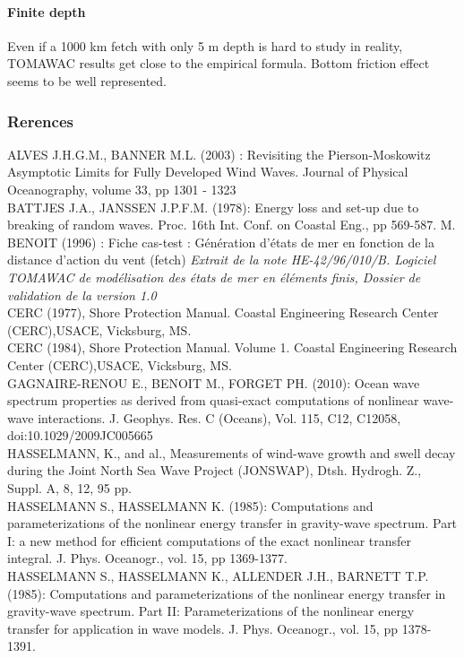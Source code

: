 \paragraph*{Finite depth}
Even if a 1000 km fetch with only 5 m depth is hard to study in reality, TOMAWAC results get close to the empirical formula. Bottom friction effect seems to be well represented.
\subsubsection*{Rerences}

ALVES J.H.G.M., BANNER M.L. (2003) : Revisiting the Pierson-Moskowitz Asymptotic Limits for Fully Developed Wind Waves. Journal of Physical Oceanography, volume 33, pp 1301 - 1323\\
 BATTJES J.A., JANSSEN J.P.F.M. (1978): Energy loss and set-up due to breaking of random waves. Proc.
16th Int. Conf. on Coastal Eng., pp 569-587.
 M. BENOIT (1996) : Fiche cas-test : G\'en\'eration d'\'etats de mer en fonction de la distance d'action du vent (fetch) \textit{Extrait de la note HE-42/96/010/B. Logiciel TOMAWAC de mod\'elisation des \'etats de mer en \'el\'ements finis, Dossier de validation de la version 1.0} \\
 CERC (1977), Shore Protection Manual. Coastal Engineering Research Center (CERC),USACE, Vicksburg, MS.\\
 CERC (1984), Shore Protection Manual. Volume 1. Coastal Engineering Research Center (CERC),USACE, Vicksburg, MS.\\
GAGNAIRE-RENOU E., BENOIT M., FORGET PH. (2010): Ocean wave spectrum properties as derived
from quasi-exact computations of nonlinear wave-wave interactions. J. Geophys. Res. C (Oceans),
Vol. 115, C12, C12058, doi:10.1029/2009JC005665\\
 HASSELMANN, K., and al., Measurements of wind-wave growth and swell decay during the Joint North Sea Wave Project (JONSWAP), Dtsh. Hydrogh. Z., Suppl. A, 8, 12, 95 pp.\\
HASSELMANN S., HASSELMANN K. (1985): Computations and parameterizations of the nonlinear energy
transfer in gravity-wave spectrum. Part I: a new method for efficient computations of the exact nonlinear
transfer integral. J. Phys. Oceanogr., vol. 15, pp 1369-1377.\\
HASSELMANN S., HASSELMANN K., ALLENDER J.H., BARNETT T.P. (1985): Computations and
parameterizations of the nonlinear energy transfer in gravity-wave spectrum. Part II: Parameterizations of
the nonlinear energy transfer for application in wave models. J. Phys. Oceanogr., vol. 15, pp 1378-1391.\\
